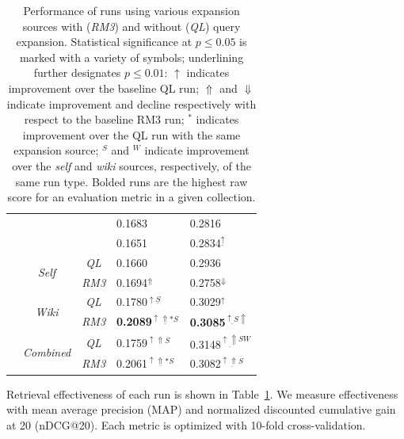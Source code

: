 \documentclass[sigconf]{acmart}
\begin{document}
\begin{table}
\begin{tabular}{|c|c|c|l|l|}
\rule{0pt}{2.5ex} \multirow{8}{*}{wt10g} & \cellcolor{gray!50} & \cellcolor{gray!50}{\it QL} & \cellcolor{gray!50}0.1683 & \cellcolor{gray!50}0.2816 \\ \cline{3-5}
\rule{0pt}{2.5ex} & \cellcolor{gray!50} \multirow{-2}{*}{\it Baseline} & \cellcolor{gray!50}{\it RM3} & \cellcolor{gray!50}0.1651 & \cellcolor{gray!50}0.2834$^{\underline{\uparrow}}$ \\ \cline{2-5}
\rule{0pt}{2.5ex} & \multirow{2}{*}{\it Self} & {\it QL} & 0.1660 & 0.2936 \\ \cline{3-5}
\rule{0pt}{2.5ex} & & {\it RM3} & 0.1694$^\Uparrow$ & 0.2758$^\Downarrow$ \\ \cline{2-5}
\rule{0pt}{2.5ex} & \multirow{2}{*}{\it Wiki} & {\it QL} & 0.1780$^{\uparrow \underline{S}}$ & 0.3029$^\uparrow$ \\ \cline{3-5}
\rule{0pt}{2.5ex} & & {\it RM3} & \textbf{0.2089}$^{\underline{\uparrow\Uparrow *S}}$ & \textbf{0.3085}$^{\underline{\uparrow S}\Uparrow}$ \\ \cline{2-5}
\rule{0pt}{2.5ex} & \multirow{2}{*}{\it Combined} & {\it QL} & 0.1759$^{\uparrow\Uparrow S}$ & 0.3148$^{\underline{\uparrow\Uparrow} SW}$ \\ \cline{3-5}
\rule{0pt}{2.5ex} & & {\it RM3} & 0.2061$^{\underline{\uparrow\Uparrow *S}}$ & 0.3082$^{\underline{\uparrow\Uparrow S}}$ \\ \hline
\end{tabular}
\caption{Performance of runs using various expansion sources with (\textit{RM3}) and without (\textit{QL}) query expansion. Statistical significance at $p \leq 0.05$ is marked with a variety of symbols; underlining further designates $p \leq 0.01$: $\uparrow$ indicates improvement over the baseline QL run; $\Uparrow$ and $\Downarrow$ indicate improvement and decline respectively with respect to the baseline RM3 run; $^{*}$ indicates improvement over the QL run with the same expansion source; $^{S}$ and $^{W}$ indicate improvement over the \textit{self} and \textit{wiki} sources, respectively, of the same run type. Bolded runs are the highest raw score for an evaluation metric in a given collection.}
\label{table.effectiveness}
\end{table}

Retrieval effectiveness of each run is shown in Table~\ref{table.effectiveness}. We measure effectiveness with mean average precision (MAP) and normalized discounted cumulative gain at 20 (nDCG@20). Each metric is optimized with 10-fold cross-validation.
\end{document}
